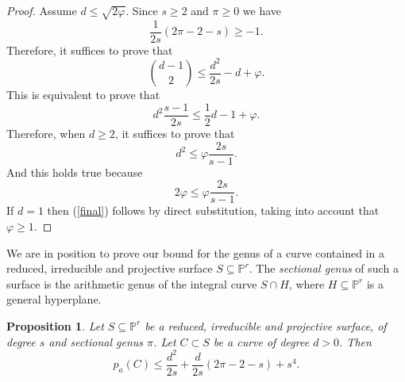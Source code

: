 \documentclass[9pt,a4paper]{amsart}
\theoremstyle{plain}
\newtheorem{proposition}[theorem]{Proposition}
\theoremstyle{definition}
\theoremstyle{remark}
\begin{document}
\begin{proof} Assume  $d\leq \sqrt{2\varphi}$. Since $s\geq 2$ and $\pi\geq 0$ we
have
$$
\frac{1}{2s}(2\pi-2-s)\geq -1.
$$
Therefore, it suffices to prove that
$$
\binom{d-1}{2}\leq \frac{d^2}{2s}-d+\varphi.
$$
This is equivalent to prove that
\begin{equation}\label{final}
d^2\frac{s-1}{2s}\leq \frac{1}{2}d-1+\varphi.
\end{equation}
Therefore, when $d\geq 2$, it suffices to prove that
$$
d^2\leq \varphi \frac{2s}{s-1}.
$$
And this holds true because
$$
2\varphi \leq\varphi \frac{2s}{s-1}.
$$
If $d=1$ then (\ref{final}) follows by direct substitution, taking
into account that $\varphi\geq 1$.
\end{proof}

\smallskip
We are in position to prove our bound for the genus of a curve
contained in a reduced, irreducible and projective surface
$S\subseteq \mathbb P^r$. The {\it sectional genus} of such a
surface is the arithmetic genus of the integral curve $S\cap H$,
where $H\subseteq \mathbb P^r$ is a general hyperplane.


\medskip
\begin{proposition}\label{nSintegra} Let $S\subseteq \mathbb P^r$ be
a reduced, irreducible and projective surface, of degree $s$ and
sectional genus $\pi$. Let $C\subset S$ be a curve of degree $d>0$.
Then
\begin{equation}\label{bound0}
p_a(C)\leq \frac{d^2}{2s}+\frac{d}{2s}(2\pi-2-s)+s^4.
\end{equation}
\end{proposition}
\end{document}
